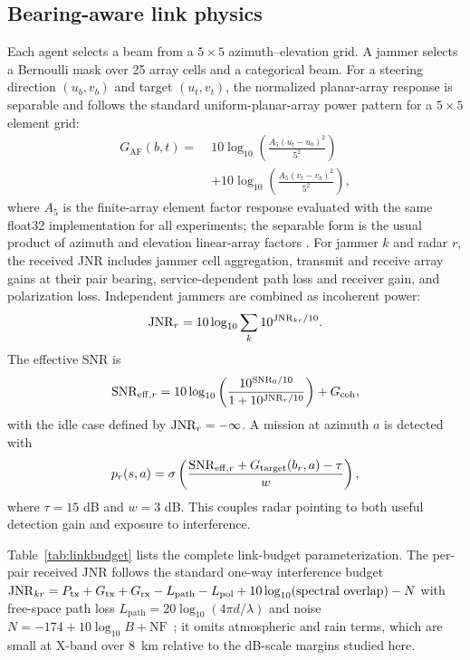 \subsection{Bearing-aware link physics}
Each agent selects a beam from a $5\times5$ azimuth--elevation grid. A jammer selects a Bernoulli mask over 25 array cells and a categorical beam. For a steering direction $(u_b,v_b)$ and target $(u_t,v_t)$, the normalized planar-array response is separable and follows the standard uniform-planar-array power pattern for a $5\times5$ element grid:
\begin{align}
 G_{\mathrm{AF}}(b,t)=\;&10\log_{10}\!\left(\frac{A_{5}(u_t-u_b)^2}{5^2}\right)\nonumber\\
 &+10\log_{10}\!\left(\frac{A_{5}(v_t-v_b)^2}{5^2}\right),
\end{align}
where $A_5$ is the finite-array element factor response evaluated with the same float32 implementation for all experiments; the separable form is the usual product of azimuth and elevation linear-array factors \cite{skolnik2008,vantrees2002}. For jammer $k$ and radar $r$, the received JNR includes jammer cell aggregation, transmit and receive array gains at their pair bearing, service-dependent path loss and receiver gain, and polarization loss. Independent jammers are combined as incoherent power:
\begin{equation}
 \label{eq:jnrsum}
 \mathrm{JNR}_r=10\log_{10}\sum_k10^{\mathrm{JNR}_{kr}/10}.
\end{equation}
The effective SNR is
\begin{equation}
 \mathrm{SNR}_{\mathrm{eff},r}=10\log_{10}\left(\frac{10^{\mathrm{SNR}_0/10}}{1+10^{\mathrm{JNR}_r/10}}\right)+G_{\mathrm{coh}},
\end{equation}
with the idle case defined by $\mathrm{JNR}_r=-\infty$. A mission at azimuth $a$ is detected with
\begin{equation}
 p_{r}(s,a)=\sigma\left(\frac{\mathrm{SNR}_{\mathrm{eff},r}+G_{\mathrm{target}}(b_r,a)-\tau}{w}\right),
\end{equation}
where $\tau=15$ dB and $w=3$ dB. This couples radar pointing to both useful detection gain and exposure to interference.

Table~\ref{tab:linkbudget} lists the complete link-budget parameterization. The per-pair received JNR follows the standard one-way interference budget $\mathrm{JNR}_{kr}=P_{\mathrm{tx}}+G_{\mathrm{tx}}+G_{\mathrm{rx}}-L_{\mathrm{path}}-L_{\mathrm{pol}}+10\log_{10}(\text{spectral overlap})-N$ with free-space path loss $L_{\mathrm{path}}=20\log_{10}(4\pi d/\lambda)$ and noise $N=-174+10\log_{10}B+\mathrm{NF}$~\cite{neri2006book}; it omits atmospheric and rain terms, which are small at X-band over 8~km relative to the dB-scale margins studied here.

